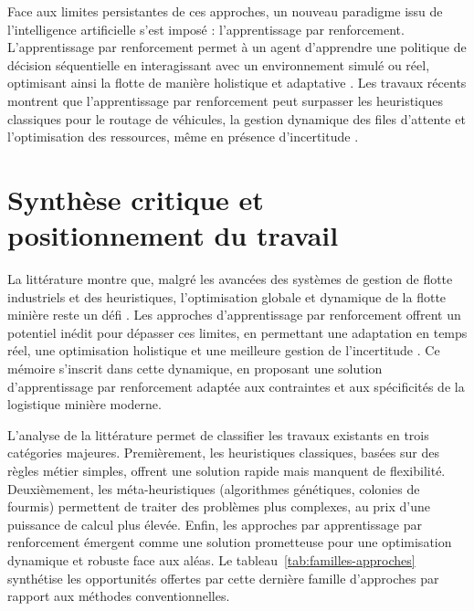 \documentclass[11pt,a4paper]{report}
\begin{document}

Face aux limites persistantes de ces approches, un nouveau paradigme issu de l’intelligence artificielle s’est imposé : l’apprentissage par renforcement. L'apprentissage par renforcement permet à un agent d’apprendre une politique de décision séquentielle en interagissant avec un environnement simulé ou réel, optimisant ainsi la flotte de manière holistique et adaptative \cite{MohammadrezaNazari2018, CongZhang2020}. Les travaux récents montrent que l'apprentissage par renforcement peut surpasser les heuristiques classiques pour le routage de véhicules, la gestion dynamique des files d’attente et l’optimisation des ressources, même en présence d’incertitude \cite{WZeng2022, MiladAbolghasemian2020}.

\section{Synthèse critique et positionnement du travail}

\label{sec:synthese-etat-art}

La littérature montre que, malgré les avancées des systèmes de gestion de flotte industriels et des heuristiques, l’optimisation globale et dynamique de la flotte minière reste un défi \cite{MarceloMorettiFioroni2008, BurakOzdemir2019}. Les approches d'apprentissage par renforcement offrent un potentiel inédit pour dépasser ces limites, en permettant une adaptation en temps réel, une optimisation holistique et une meilleure gestion de l’incertitude \cite{MohammadrezaNazari2018, WZeng2022}. Ce mémoire s’inscrit dans cette dynamique, en proposant une solution d'apprentissage par renforcement adaptée aux contraintes et aux spécificités de la logistique minière moderne.

L'analyse de la littérature permet de classifier les travaux existants en trois catégories majeures. Premièrement, les heuristiques classiques, basées sur des règles métier simples, offrent une solution rapide mais manquent de flexibilité. Deuxièmement, les méta-heuristiques (algorithmes génétiques, colonies de fourmis) permettent de traiter des problèmes plus complexes, au prix d'une puissance de calcul plus élevée. Enfin, les approches par apprentissage par renforcement émergent comme une solution prometteuse pour une optimisation dynamique et robuste face aux aléas. Le tableau~\ref{tab:familles-approches} synthétise les opportunités offertes par cette dernière famille d'approches par rapport aux méthodes conventionnelles.
\end{document}
